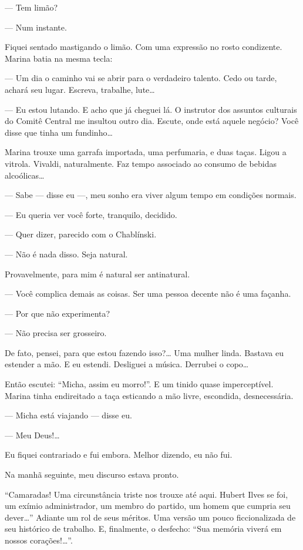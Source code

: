 --- Tem limão?

--- Num instante.

Fiquei sentado mastigando o limão. Com uma expressão no rosto
condizente. Marina batia na mesma tecla:

--- Um dia o caminho vai se abrir para o verdadeiro talento. Cedo ou
tarde, achará seu lugar. Escreva, trabalhe, lute\ldots{}

--- Eu estou lutando. E acho que já cheguei lá. O instrutor dos assuntos
culturais do Comitê Central me insultou outro dia. Escute, onde está
aquele negócio? Você disse que tinha um fundinho\ldots{}

Marina trouxe uma garrafa importada, uma perfumaria, e duas
taças. Ligou a vitrola. Vivaldi, naturalmente. Faz tempo associado ao
consumo de bebidas alcoólicas\ldots{}

--- Sabe --- disse eu ---, meu sonho era viver algum tempo em condições
normais.

--- Eu queria ver você forte, tranquilo, decidido.

--- Quer dizer, parecido com o Chablínski.

--- Não é nada disso. Seja natural.

Provavelmente, para mim é natural ser antinatural.

--- Você complica demais as coisas. Ser uma pessoa decente não é uma
façanha.

--- Por que não experimenta?

--- Não precisa ser grosseiro.

De fato, pensei, para que estou fazendo isso?\ldots{} Uma mulher linda.
Bastava eu estender a mão. E eu estendi. Desliguei a música. Derrubei o
copo\ldots{}

Então escutei: ``Micha, assim eu morro!''. E um tinido quase
imperceptível. Marina tinha endireitado a taça esticando a mão livre,
escondida, desnecessária.

--- Micha está viajando --- disse eu.

--- Meu Deus!\ldots{}

Eu fiquei contrariado e fui embora. Melhor dizendo, eu não fui.

\bigskip

Na manhã seguinte, meu discurso estava pronto.

``Camaradas! Uma circunstância triste nos trouxe até aqui. Hubert Ilves
se foi, um exímio administrador, um membro do partido, um homem que
cumpria seu dever\ldots{}'' Adiante um rol de seus méritos. Uma versão um
pouco ficcionalizada de seu histórico de trabalho. E, finalmente, o
desfecho: ``Sua memória viverá em nossos corações!\ldots{}''.


